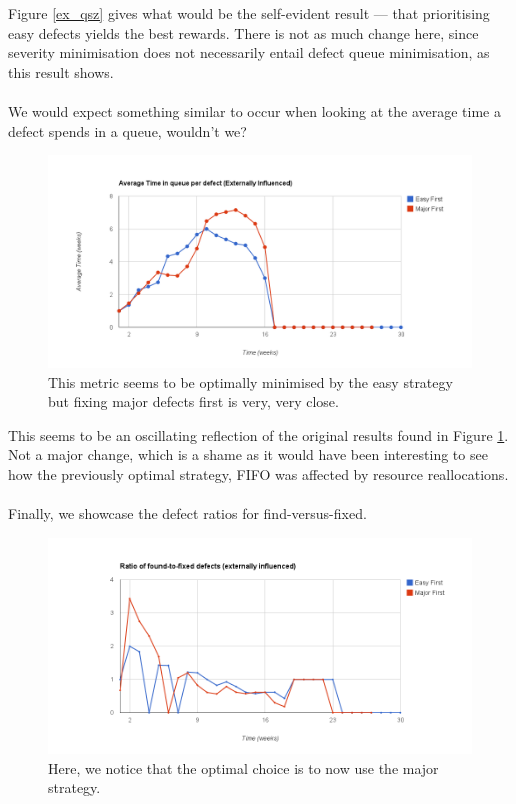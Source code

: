 Figure \ref{ex_qsz} gives what would be the self-evident result --- that prioritising easy defects
yields the best rewards.
There is not as much change here, since severity minimisation does not necessarily entail defect
queue minimisation, as this result shows.\\
\\
We would expect something similar to occur when looking at the average time a defect spends in a
queue, wouldn't we?

\pagebreak

\begin{figure}[ht!]
	\centering
	\includegraphics[scale=0.45]{graphs/avgQueueTime_ex.png}
	\caption{This metric seems to be optimally minimised by the easy strategy but fixing major defects
first is very, very close.} 
	\label{ex_avgqtime}
\end{figure}

This seems to be an oscillating reflection of the original results found in Figure
\ref{ex_avgqtime}.
Not a major change, which is a shame as it would have been interesting to see how the previously
optimal strategy, FIFO was affected by resource reallocations.\\
\\
Finally, we showcase the defect ratios for find-versus-fixed.

\pagebreak

\begin{figure}[ht!]
	\centering
	\includegraphics[scale=0.45]{graphs/RatioFF_ex.png}
	\caption{Here, we notice that the optimal choice is to now use the major strategy.} 
	\label{ex_ratioff}
\end{figure}

